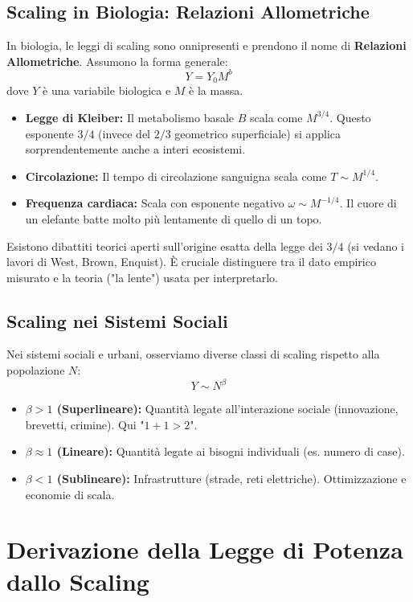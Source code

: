\subsection{Scaling in Biologia: Relazioni Allometriche}
In biologia, le leggi di scaling sono onnipresenti e prendono il nome di \textbf{Relazioni Allometriche}. Assumono la forma generale:
\begin{equation}
    Y = Y_0 M^b
\end{equation}
dove $Y$ è una variabile biologica e $M$ è la massa.
\begin{itemize}
    \item \textbf{Legge di Kleiber:} Il metabolismo basale $B$ scala come $M^{3/4}$. Questo esponente $3/4$ (invece del $2/3$ geometrico superficiale) si applica sorprendentemente anche a interi ecosistemi.
    \item \textbf{Circolazione:} Il tempo di circolazione sanguigna scala come $T \sim M^{1/4}$.
    \item \textbf{Frequenza cardiaca:} Scala con esponente negativo $\omega \sim M^{-1/4}$. Il cuore di un elefante batte molto più lentamente di quello di un topo.
\end{itemize}
Esistono dibattiti teorici aperti sull'origine esatta della legge dei $3/4$ (si vedano i lavori di West, Brown, Enquist). È cruciale distinguere tra il dato empirico misurato e la teoria ("la lente") usata per interpretarlo.

\subsection{Scaling nei Sistemi Sociali}
Nei sistemi sociali e urbani, osserviamo diverse classi di scaling rispetto alla popolazione $N$:
\begin{equation}
    Y \sim N^{\beta}
\end{equation}
\begin{itemize}
    \item \textbf{$\beta > 1$ (Superlineare):} Quantità legate all'interazione sociale (innovazione, brevetti, crimine). Qui "$1+1 > 2$".
    \item \textbf{$\beta \approx 1$ (Lineare):} Quantità legate ai bisogni individuali (es. numero di case).
    \item \textbf{$\beta < 1$ (Sublineare):} Infrastrutture (strade, reti elettriche). Ottimizzazione e economie di scala.
\end{itemize}

\section{Derivazione della Legge di Potenza dallo Scaling}

